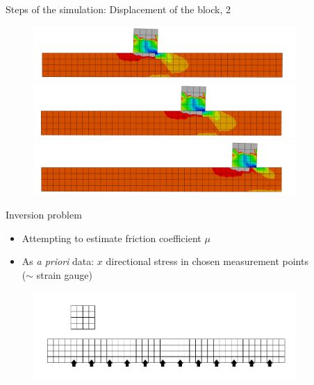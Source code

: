 \documentclass{beamer}
\begin{document}
\begin{frame}{Steps of the simulation: Displacement of the block, 2}

\begin{figure}
\includegraphics[width=10cm]{anim3.pdf}\\
\includegraphics[width=10cm]{anim4.pdf}\\
\includegraphics[width=10cm]{anim5.pdf}
\end{figure}

\end{frame}

\begin{frame}{Inversion problem}

\begin{itemize}
\item Attempting to estimate friction coefficient $\mu$
\item As \emph{a priori} data: $x$ directional stress in chosen measurement points\\($\sim$ strain gauge)
\end{itemize}

\begin{figure}
\includegraphics[width=10cm]{fretting_geom_meas.pdf}
\end{figure}


\end{frame}
\end{document}
